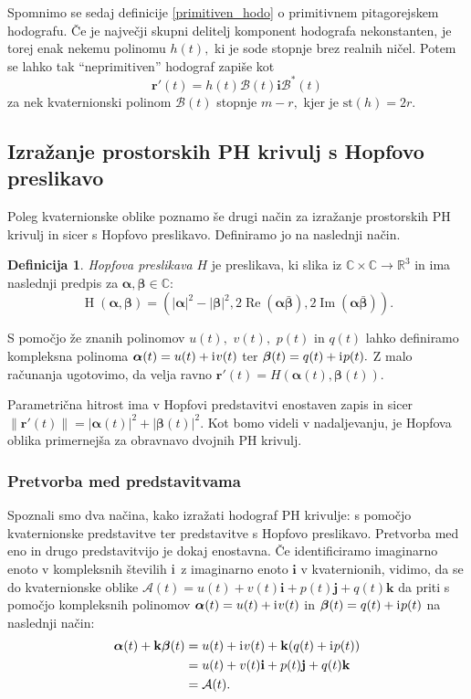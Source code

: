 \documentclass[12pt,a4paper,twoside]{article}
\newcommand{\iu}{\mathrm{i}\mkern1mu} %
\theoremstyle{definition} %
\newtheorem{definicija}{Definicija}[section]
\theoremstyle{plain} %
\numberwithin{equation}{section}  %
\newcommand{\R}{\mathbb R}
\renewcommand{\C}{\mathbb C}
\newcommand{\rV}{\mathbf{r}}
\newcommand{\iV}{\mathbf{i}}
\newcommand{\jV}{\mathbf{j}}
\newcommand{\kV}{\mathbf{k}}
\newcommand{\AQ}{\mathcal{A}}
\newcommand{\BQ}{\mathcal{B}}
\newcommand{\balpha}{\boldsymbol \alpha}
\newcommand{\bbeta}{\boldsymbol \beta}
\DeclareMathOperator{\hopf}{H}
\DeclareMathOperator{\ReC}{Re}
\DeclareMathOperator{\ImC}{Im}
\begin{document}
Spomnimo se sedaj definicije \ref{primitiven_hodo} o primitivnem pitagorejskem hodografu. Če je največji skupni delitelj komponent hodografa nekonstanten, je torej enak nekemu polinomu $h(t),$ ki je sode stopnje brez realnih ničel. Potem se lahko tak ``neprimitiven'' hodograf zapiše kot
\begin{equation}
	\label{Bkvaternion}
	\rV'(t)=h(t)\BQ(t)\iV\BQ^*(t)
\end{equation}
za nek kvaternionski polinom $\BQ(t)$ stopnje $m-r,$ kjer je $\mathrm{st}(h)=2r.$

\subsection{Izražanje prostorskih PH krivulj s Hopfovo preslikavo}
\label{hopf}

Poleg kvaternionske oblike poznamo še drugi način za izražanje prostorskih PH krivulj in sicer s Hopfovo preslikavo. Definiramo jo na naslednji način.
\begin{definicija}
	\label{hopf_def}
	\emph{Hopfova preslikava} $H$ je preslikava, ki slika iz $\C \times \C \to \R^3$ in ima naslednji predpis za $\balpha, \bbeta \in \C:$
	\begin{equation}
		\label{hoph}
		\hopf(\balpha, \bbeta)=(|\balpha|^2-|\bbeta|^2,2\ReC(\balpha \bar{\bbeta}),2\ImC(\balpha \bar{\bbeta})).
	\end{equation}
\end{definicija}
S pomočjo že znanih polinomov $u(t),$ $v(t),$ $p(t)$ in $q(t)$ lahko definiramo kompleksna polinoma $\balpha(t)=u(t)+\iu v(t)$ ter $\bbeta(t)=q(t)+\iu p(t).$ Z malo računanja ugotovimo, da velja ravno $\rV'(t)=H(\balpha(t),\bbeta(t)).$

Parametrična hitrost ima v Hopfovi predstavitvi enostaven zapis in sicer \\ $\lVert \rV'(t) \rVert=|\balpha(t)|^2+|\bbeta(t)|^2.$ Kot bomo videli v nadaljevanju, je Hopfova oblika primernejša za obravnavo dvojnih PH krivulj.

\subsubsection{Pretvorba med predstavitvama}

Spoznali smo dva načina, kako izražati hodograf PH krivulje: s pomočjo kvaternionske predstavitve ter predstavitve s Hopfovo preslikavo. Pretvorba med eno in drugo predstavitvijo je dokaj enostavna. Če identificiramo imaginarno enoto v kompleksnih številih $\iu$ z imaginarno enoto $\iV$ v kvaternionih, vidimo, da se do kvaternionske oblike $\AQ(t)=u(t)+v(t)\iV+p(t)\jV+q(t)\kV$ da priti s pomočjo kompleksnih polinomov $\balpha(t)=u(t)+\iu v(t)$ in $\bbeta(t)=q(t)+\iu p(t)$ na naslednji način:
\begin{align}
	\label{comp_to_quat}
	\balpha(t)+\kV\bbeta(t) &= u(t)+\iu v(t)+\kV(q(t)+ \iu p(t)) \nonumber \\
	&=u(t)+v(t)\iV + p(t)\jV+ q(t)\kV \nonumber \\
	&= \AQ(t).
\end{align}
\end{document}
